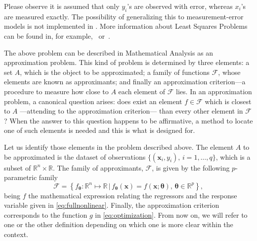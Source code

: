 Please observe it is assumed that only $y_i$'s are observed with error, whereas $x_i$'s are measured exactly. The possibility of generalizing this to measurement-error models is not implemented in . More information about Least Squares Problems can be found in, for example,~\citet{bjorck_numerical_methods} or~\citet{nocedal_numerical_optization}.

The above problem can be described in Mathematical Analysis as an approximation problem. This kind of problem is determined by three elements: a set $A$, which is the object to be approximated; a family of functions $\mathcal{F}$, whose elements are known as approximants; and finally an approximation criterion---a procedure to measure how close to $A$ each element of $\mathcal{F}$ lies. In an approximation problem, a canonical question arises: does exist an element $f \in \mathcal{F}$ which is closest to $A$ ---attending to the approximation criterion--- than every other element in $\mathcal{F}$? When the answer to this question happens to be affirmative, a method to locate one of such elements is needed and this is what  is designed for.


Let us identify those elements in the problem described above. The element $A$ to be approximated is the dataset of observations  $\{(\mathbf{x}_i, y_i),\, i = 1,\ldots,q\}$, which is a subset of $\mathbb{R}^n\times \mathbb{R}$. The family of approximants, $\mathcal{F}$, is given by the following $p$-parametric family
\begin{equation*}
\mathcal{F} = \left\{f_{\boldsymbol{\theta}}:\mathbb{R}^n\longmapsto \mathbb{R}\,|\,
f_{\boldsymbol{\theta}}(\mathbf{x}) = f(\mathbf{x};\boldsymbol{\theta}),\,\boldsymbol{\theta}\in\mathbb{R}^p\right\},
\end{equation*}
being $f$ the mathematical expression relating the regressors and the response variable given in \eqref{eq:fullnonlinear}. Finally, the approximation criterion corresponds to the function $g$ in \eqref{eq:optimization}. From now on, we will refer to one or the other definition depending on which one is more clear within the context.


